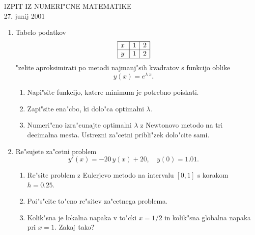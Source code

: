 \documentclass[12pt,a4paper]{article}
\begin{document}
\begin{center}
  IZPIT IZ NUMERI"CNE MATEMATIKE\\
  27. junij 2001
\end{center}

\begin{enumerate}

  \item Tabelo podatkov
   $$\begin{array}{|c||c|c|}
        \hline
        x & 1 & 2\\ \hline
        y & 1 & 2\\ \hline
      \end{array}
   $$
   "zelite aproksimirati po metodi najmanj"sih kvadratov s funkcijo
   oblike 
   $$y(x)=e^{\lambda\,x}.$$ 
    
  \begin{enumerate}
   
     \item Napi"site funkcijo, katere minimum je potrebno poiskati.
  
     \item Zapi"site ena"cbo, ki dolo"ca optimalni $\lambda$.
       
     \item Numeri"cno izra"cunajte optimalni $\lambda$ z Newtonovo metodo
           na tri decimalna mesta. Ustrezni za"cetni pribli"zek dolo"cite
           sami. 
        
  \end{enumerate}

  \item Re"sujete za"cetni problem
  $$y'(x)=-20\,y(x)+20,\quad y(0)=1.01.$$
    
  \begin{enumerate}
    
    \item Re"site problem z Eulerjevo metodo na intervalu $[0,1]$ s 
          korakom $h=0.25$.
          
    \item Poi"s"cite to"cno re"sitev za"cetnega problema.
      
    \item Kolik"sna je lokalna napaka v to"cki $x=1/2$ in kolik"sna
          globalna napaka pri $x=1$. Zakaj tako?
            
  \end{enumerate} 
\end{enumerate}
\end{document}
